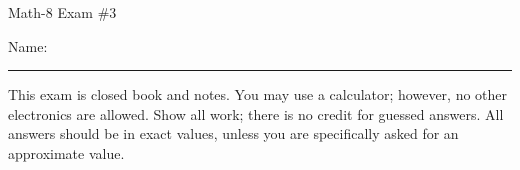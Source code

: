 \documentclass[letterpaper,12pt,fleqn]{article}
\begin{document}
\begin{center}
\Large Math-8 Exam \#3
\end{center}

\vspace{0.5in}

Name: \rule{4in}{1pt}

\vspace{0.5in}

This exam is closed book and notes. You may use a calculator; however, no other
electronics are allowed. Show all work; there is no credit for guessed
answers. All answers should be in exact values, unless you are specifically
asked for an approximate value.

\vspace{0.5in}

\newcommand{\fillin}{\rule[-10pt]{3in}{1pt}}
\newcommand{\sfillin}{\rule[-10pt]{0.5in}{1pt}}
\end{document}
